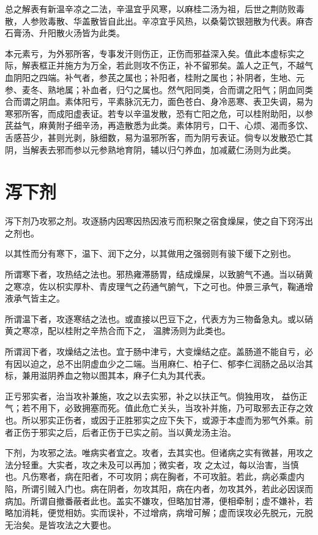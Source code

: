 \documentclass[UTF8]{ctexart}
\begin{document}
总之解表有新温辛凉之二法，辛温宜乎风寒，以麻桂二汤为祖，后世之荆防败毒散，人参败毒散、华盖散皆自此出。辛凉宜乎风热，以桑菊饮银翘散为代表。麻杏石膏汤、升阳散火汤皆为此类。

本元素亏，为外邪所客，专事发汗则伤正，正伤而邪益深入矣。值此本虚标实之际，解表框正并施方为万全，若此则攻不伤正，补不留邪矣。盖人之正气，不越气血阴阳之四端。补气者，参芪之属也；补阳者，桂附之属也；补阴者，生地、元参、麦冬、熟地属；补血者，归勺之属也。然气阳同类，合而谓之阳气；阴血同类合而谓之阴血。素体阳亏，平素脉沉无力，面色苍白、身冷恶寒、表卫失调，易为寒邪所客，而成阳虚表证。若专以辛温发散，恐有亡阳之危，可以桂附助阳，以参芪益气，麻黄附子细辛汤，再造散悉为此类。素体阴亏，口干、心烦、渴而多饮、舌感苔少，甚则光剥，脉细数，易为温邪所客，而为阴亏表证。倘专以发散恐亡其阴，当解表去邪而参以元参熟地育阴，辅以归勺养血，加减葳仁汤则为此类。

\section{泻下剂}
泻下剂乃攻邪之剂。攻逐肠内因寒因热因液亏而积聚之宿食燥屎，使之自下窍泻出之剂也。

以其性而分有寒下，温下、润下之分，以其做用之强弱则有骏下缓下之别也。

所谓寒下者，攻热结之法也。邪热雍滞肠胃，结成燥屎，以致腑气不通。当以硝黄之寒凉，佐以枳实厚朴、青皮理气之药通气腑气，下之可也。仲景三承气，鞠通增液承气皆主之。

所谓温下者，攻逐寒结之法也。或直接以巴豆下之，代表方为三物备急丸。或以硝黄之寒凉，配以桂附之辛热合而下之， 温脾汤则为此类也。

所谓润下者，攻燥结之法也。宜于肠中津亏，大变燥结之症。盖肠道不能自亏，必有因以迫之，总不出阴虚血少之二端。当用麻仁、柏子仁、郁李仁润肠之品以治其标，兼用滋阴养血之物以图其本，麻子仁丸为其代表。

正亏邪实者，治当攻补兼施，攻之以去实邪，补之以扶正气。倘独用攻， 益伤正气；若不用下，必致拥塞而死。值此危亡关头，当攻补并施，乃可取邪去正存之效也。所以邪实正伤者，或因于正胜邪实之应下失下，或源于本虚而为邪气外乘。前者正伤于邪实之后，后者正伤于已实之前。当以黄龙汤主治。

下剂，为攻邪之法。唯病实者宜之。攻者，去其实也。但诸病之实有微甚，用攻之法分轻重。大实者，攻之未及可以再加；微实者，攻 之太过，每以治害，当慎也。凡伤寒者，病在阳者，不可攻阴；病在胸者，不可攻脏。若此，病必乘虚内陷，所谓引贼入门也。病在阴者，勿攻其阳，病在内者，勿攻其外，若此必因误而病加。所谓自撤番蔽者此也。盖实不嫌攻，但略加甘滞，便相牵制；虚不嫌补，若略加消耗，便觉相妨。实而误补，不过增病，病增可解；虚而误攻必先脱元，元脱无治矣。是皆攻法之大要也。
\end{document}
